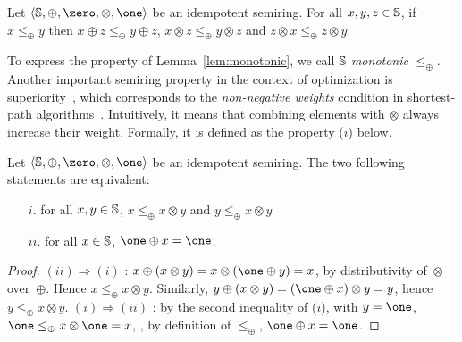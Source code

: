 \begin{lemma} \label{lem:monotonic}
Let $\< \Semiring, \oplus, \zero, \otimes, \one>$ be an idempotent semiring.
For all $x, y, z  \in \mathbb{S}$,
if $x \leq_\oplus y$ then
$x \oplus z \leq_\oplus y \oplus z$,
$x \otimes z \leq_\oplus y \otimes z$
and $z \otimes x \leq_\oplus z \otimes y$.
\end{lemma}
To express the property of Lemma~\ref{lem:monotonic}, we call
$\mathbb{S}$ \emph{monotonic} \wrt $\leq_\oplus$.
%
Another important semiring property in the context of optimization
is {superiority}~\cite{Huang08advanceddynamic},
which corresponds to the
\emph{non-negative weights} condition in shortest-path algorithms~\cite{Dijkstra59anote}.
Intuitively, it means that combining elements with $\otimes$ always increase their weight.
Formally, it is defined as the property ($i$) below. %

\begin{lemma}
\label{lem:superior}\label{lem:bounded}
Let $\< \Semiring, \oplus, \zero, \otimes, \one>$ be an idempotent semiring.
The two following statements are equivalent:
\begin{itemize}
\item [$i.$] for all $x, y \in \mathbb{S}$,
$x \leq_\oplus x \otimes y$ and
$y \leq_\oplus x \otimes y$
\item[$ii.$] for all $x \in \mathbb{S}$,  $\one \oplus x = \one$.
\end{itemize}
\end{lemma}
%
\begin{proof} %
$(ii) \Rightarrow (i)$ :
$x \oplus (x \otimes y) = x \otimes (\one \oplus y) = x$,
by distributivity of~$\otimes$ over~$\oplus$.
Hence $x \leq_\oplus x \otimes y$.
Similarly, $y \oplus (x \otimes y) = (\one \oplus x) \otimes y = y$,
hence $y \leq_\oplus x \otimes y$.
%
$(i) \Rightarrow (ii)$ :
by the second inequality of ($i$), with $y = \one$,
$\one \leq_\oplus x \otimes \one = x$, \ie,
by definition of $\leq_\oplus$, $\one \oplus x = \one$.
\end{proof}

